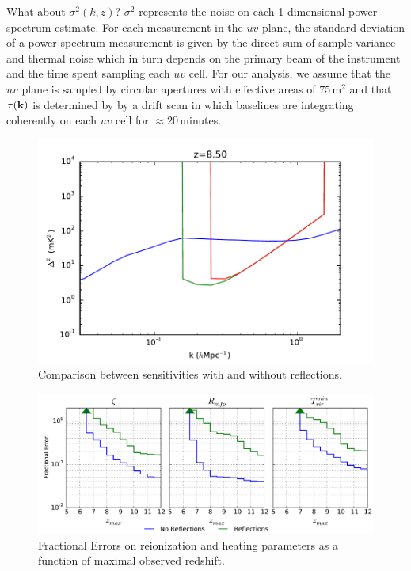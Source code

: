 \documentclass[twocolumn]{emulateapj}
\begin{document}
What about $\sigma^2(k,z)$? $\sigma^2$ represents the noise on each 1 dimensional power spectrum estimate. For each measurement in the $uv$ plane, the standard deviation of a power spectrum measurement is given by the direct sum of sample variance and thermal noise \citep{McQuinn:2006} which in turn depends on the primary beam of the instrument and the time spent sampling each $uv$ cell. For our analysis, we assume that the $uv$ plane is sampled by circular apertures with effective areas of $75$\,m$^2$ and that $\tau({\bf k})$ is determined by by a drift scan in which baselines are integrating coherently on each $uv$ cell for $\approx 20$\,minutes. 


\begin{figure}
\includegraphics[width=.5\textwidth]{figures/sensitivity_comparison.pdf}
\caption{Comparison between sensitivities with and without reflections.}
\end{figure}




\begin{figure}[h!]
\includegraphics[width=\textwidth]{figures/sigmaVsZ_reionization.pdf}
\caption{Fractional Errors on reionization and heating parameters as a function of maximal observed redshift.}
\end{figure}
\end{document}
